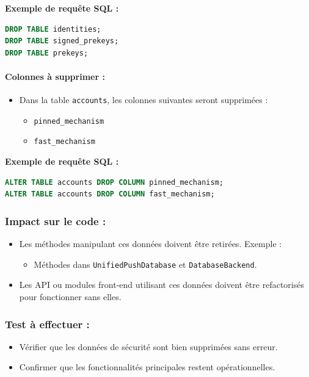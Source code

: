 \documentclass[a4paper,11pt]{article}
\begin{document}
\textbf{Exemple de requête SQL :}
\begin{lstlisting}[language=SQL]
DROP TABLE identities;
DROP TABLE signed_prekeys;
DROP TABLE prekeys;
\end{lstlisting}

\paragraph{Colonnes à supprimer :}
\begin{itemize}
    \item Dans la table \texttt{accounts}, les colonnes suivantes seront supprimées :
    \begin{itemize}
        \item \texttt{pinned\_mechanism}
        \item \texttt{fast\_mechanism}
    \end{itemize}
\end{itemize}

\textbf{Exemple de requête SQL :}
\begin{lstlisting}[language=SQL]
ALTER TABLE accounts DROP COLUMN pinned_mechanism;
ALTER TABLE accounts DROP COLUMN fast_mechanism;
\end{lstlisting}

\subsubsection*{Impact sur le code :}
\begin{itemize}
    \item Les méthodes manipulant ces données doivent être retirées. Exemple :
    \begin{itemize}
        \item Méthodes dans \texttt{UnifiedPushDatabase} et \texttt{DatabaseBackend}.
    \end{itemize}
    \item Les API ou modules front-end utilisant ces données doivent être refactorisés pour fonctionner sans elles.
\end{itemize}

\subsubsection*{Test à effectuer :}
\begin{itemize}
    \item Vérifier que les données de sécurité sont bien supprimées sans erreur.
    \item Confirmer que les fonctionnalités principales restent opérationnelles.
\end{itemize}
\end{document}
